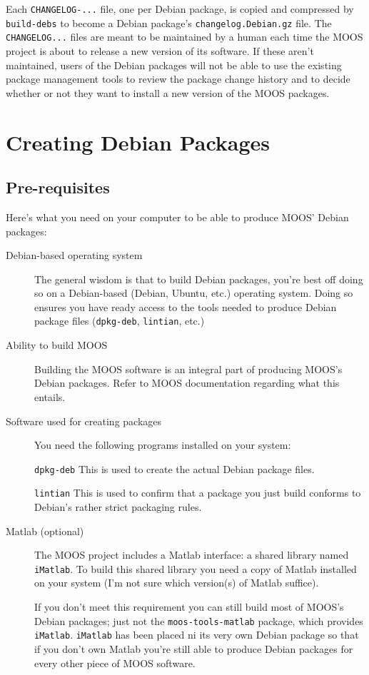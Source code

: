 \documentclass[letterpaper,10pt]{article}
\begin{document}
\begin{description}
Each \verb|CHANGELOG-...| file, one per Debian package, is copied and
compressed by \verb|build-debs| to become a Debian package's 
\verb|changelog.Debian.gz| file.  The \verb|CHANGELOG...| files 
are meant to be maintained
by a human each time the MOOS project is about to release a new version of its 
software.  If these aren't maintained, users of the Debian packages will not be
able to use the existing package management tools to review the package change
history and to decide whether or not they want to install a new version of the
MOOS packages.

 \end{description}

\section{Creating Debian Packages}
\subsection{Pre-requisites}
Here's what you need on your computer to be able to produce MOOS' Debian 
packages:
\begin{description}
 \item[Debian-based operating system]
	The general wisdom is that to build Debian packages, you're best off
	doing so on a Debian-based (Debian, Ubuntu, etc.) operating system.
	Doing so ensures you have ready access to the
	tools needed to produce Debian package files (\verb|dpkg-deb|, 
	\verb|lintian|, etc.)
 \item[Ability to build MOOS]
	Building the MOOS software is an integral part of producing MOOS's
	Debian packages.  Refer to MOOS documentation regarding what this
	entails.
 \item[Software used for creating packages]
	You need the following programs installed on your system:

	\verb|dpkg-deb| This is used to create the actual Debian package files.

	\verb|lintian| This is used to confirm that a package you just build
	conforms to Debian's rather strict packaging rules.
 \item[Matlab (optional)]
	The MOOS project includes a Matlab interface: a shared library
	named \verb|iMatlab|.  To build this shared library you need a copy of
	Matlab installed on your system (I'm not sure which version(s) of 
	Matlab suffice).  

	If you don't meet this requirement you can still
	build most of MOOS's Debian packages; just not the \verb|moos-tools-matlab|
	package, which provides \verb|iMatlab|.  \verb|iMatlab| has been placed
	ni its very own Debian package so that if you don't own Matlab you're 
	still able to produce Debian packages for every other piece of MOOS 
	software.
 \end{description}
\end{document}
